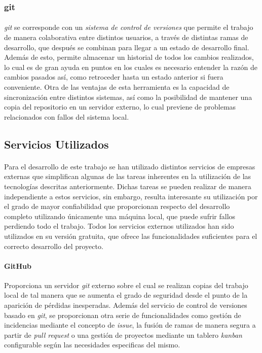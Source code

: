 \documentclass{subfiles}
\begin{document}
        \subsubsection{git}
        \label{sec:git}

          \paragraph{}
          \emph{git} se corresponde con un \emph{sistema de control de versiones} que permite el trabajo de manera colaborativa entre distintos usuarios, a través de distintas ramas de desarrollo, que después se combinan para llegar a un estado de desarrollo final. Además de esto, permite almacenar un historial de todos los cambios realizados, lo cual es de gran ayuda en puntos en los cuales es necesario entender la razón de cambios pasados así, como retroceder hasta un estado anterior si fuera conveniente. Otra de las ventajas de esta herramienta es la capacidad de sincronización entre distintos sistemas, así como la posibilidad de mantener una copia del repositorio en un servidor externo, lo cual previene de problemas relacionados con fallos del sistema local.

      \subsection{Servicios Utilizados}
      \label{sec:used_services}

        \paragraph{}
        Para el desarrollo de este trabajo se han utilizado distintos servicios de empresas externas que simplifican algunas de las tareas inherentes en la utilización de las tecnologías descritas anteriormente. Dichas tareas se pueden realizar de manera independiente a estos servicios, sin embargo, resulta interesante su utilización por el grado de mayor confiabilidad que proporcionan respecto del desarrollo completo utilizando únicamente una máquina local, que puede sufrir fallos perdiendo todo el trabajo. Todos los servicios externos utilizados han sido utilizados en su versión gratuita, que ofrece las funcionalidades suficientes para el correcto desarrollo del proyecto.

        \paragraph{GitHub}
        Proporciona un servidor \emph{git} externo sobre el cual se realizan copias del trabajo local de tal manera que se aumenta el grado de seguridad desde el punto de la aparición de pérdidas inesperadas. Además del servicio de control de versiones basado en \emph{git}, se proporcionan otra serie de funcionalidades como gestión de incidencias mediante el concepto de \emph{issue}, la fusión de ramas de manera segura a partir de \emph{pull request} o una gestión de proyectos mediante un tablero \emph{kanban} configurable según las necesidades especificas del mismo.
\end{document}
